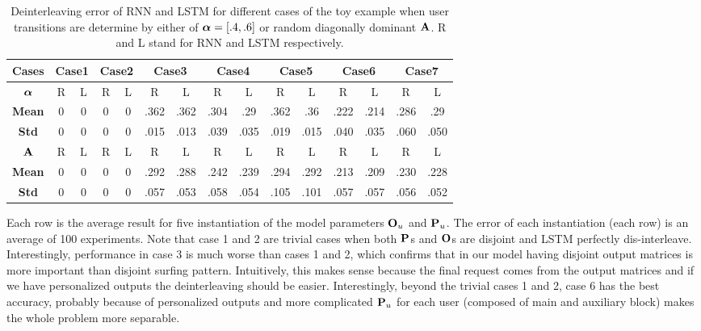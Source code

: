 	\begin{table}
		\scriptsize  
		\centering
		\begin{tabular}{|c|c|c|c|c|c|c|c|c|c|c|c|c|c|c|}
			\hline
			{\bf \footnotesize Cases} & \multicolumn{2}{c|}{\bf \footnotesize  Case1} & \multicolumn{2}{c|}{\bf \footnotesize  Case2} & \multicolumn{2}{c|}{\bf \footnotesize  Case3} & \multicolumn{2}{c|}{\bf \footnotesize  Case4} & \multicolumn{2}{c|}{\bf \footnotesize  Case5} & \multicolumn{2}{c|}{\bf \footnotesize Case6} & \multicolumn{2}{c|}{\bf \footnotesize  Case7}  \\ 
			\hline  
			{\bf $\aalpha$} 		
			&  R 	& L  	&  R	& L 	&  	R 		& L  &  R  & L  & R  	& L 	&  R  	& L 	&  R 	& L \\ \hline 			
			{\bf \footnotesize  Mean} 		
			&  0 	& 0		&  0 	& 0		& 	.362 	& .362	& .304 & .29	& .362 &  .36	& .222 &  .214& .286 & .29 \\ \hline 
			{\bf \footnotesize  Std} 	
			&  0 	& 0		&  0 	& 0		& 	.015 	& .013	& .039 & .035	& .019 &  .015& .040 &  .035& .060 &  .050\\ \hline 
			\hline  
			{\bf $\A$} 		
			&  R 	& L  	&  R	& L 	&  	R 		& L  &  R  & L  & R  	& L 	&  R  	& L 	&  R 	& L \\ \hline 			
			{\bf \footnotesize  Mean} 		
			&  0 	& 0		&  0 	& 0		& 	.292 	& .288	& .242 & .239	& .294 &  .292	& .213 &  .209 & .230 & .228 \\ \hline 
			{\bf \footnotesize  Std} 	
			&  0 	& 0		&  0 	& 0		& 	.057 	& .053	& .058 & .054	& .105 &  .101 & .057 &  .057 & .056 & .052  \\ \hline 
		\end{tabular}
		\caption{Deinterleaving error of RNN and LSTM for different cases of the toy example when user transitions are determine by either of $\aalpha = [.4, .6]$ or random diagonally dominant $\A$. R and L stand for RNN and LSTM respectively.}
		\label{tab:as}
	\end{table}
	
	Each row is the average result for five instantiation of the model parameters $\O_u$ and $\P_u$. 
	The error of each instantiation (each row) is an average of 100 experiments. 
	Note that case 1 and 2 are trivial cases when both $\P$s and $\O$s are disjoint and LSTM perfectly dis-interleave. 
	Interestingly, performance in case 3 is much worse than cases 1 and 2, which confirms that in our model having disjoint output matrices is more important than disjoint surfing pattern. 
	Intuitively, this makes sense because the final request comes from the output matrices and if we have personalized outputs the deinterleaving should be easier. 
	Interestingly, beyond the trivial cases 1 and 2, case 6 has the best accuracy, probably because of personalized outputs and more complicated $\P_u$ for each user (composed of main and auxiliary block) makes the whole problem more separable. 
	
